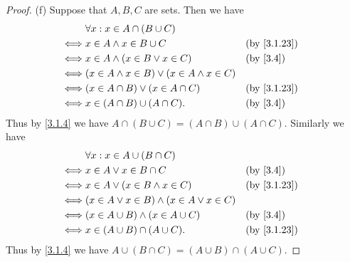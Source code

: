 \begin{proof}{(f)}
	Suppose that \(A, B, C\) are sets.
	Then we have
	\begin{align*}
		     & \forall x : x \in A \cap (B \cup C)                                   \\
		\iff & x \in A \land x \in B \cup C                         &  & \by{3.1.23} \\
		\iff & x \in A \land (x \in B \lor x \in C)                 &  & \by{3.4}    \\
		\iff & (x \in A \land x \in B) \lor (x \in A \land x \in C)                  \\
		\iff & (x \in A \cap B) \lor (x \in A \cap C)               &  & \by{3.1.23} \\
		\iff & x \in (A \cap B) \cup (A \cap C).                    &  & \by{3.4}
	\end{align*}
	Thus by \cref{3.1.4} we have \(A \cap (B \cup C) = (A \cap B) \cup (A \cap C)\).
	Similarly we have
	\begin{align*}
		     & \forall x : x \in A \cup (B \cap C)                                  \\
		\iff & x \in A \lor x \in B \cap C                         &  & \by{3.4}    \\
		\iff & x \in A \lor (x \in B \land x \in C)                &  & \by{3.1.23} \\
		\iff & (x \in A \lor x \in B) \land (x \in A \lor x \in C)                  \\
		\iff & (x \in A \cup B) \land (x \in A \cup C)             &  & \by{3.4}    \\
		\iff & x \in (A \cup B) \cap (A \cup C).                   &  & \by{3.1.23}
	\end{align*}
	Thus by \cref{3.1.4} we have \(A \cup (B \cap C) = (A \cup B) \cap (A \cup C)\).
\end{proof}

